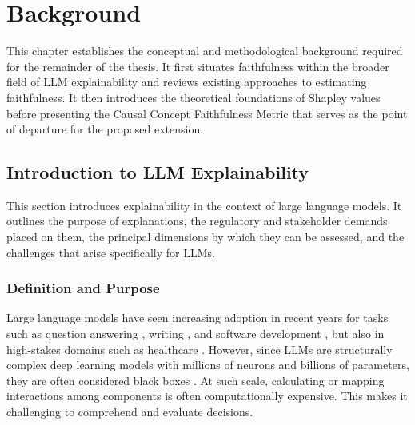 \chapter{Background}
This chapter establishes the conceptual and methodological background required for the remainder of the thesis. It first situates faithfulness within the broader field of LLM explainability and reviews existing approaches to estimating faithfulness. It then introduces the theoretical foundations of Shapley values before presenting the Causal Concept Faithfulness Metric that serves as the point of departure for the proposed extension.

\section{Introduction to LLM Explainability}
This section introduces explainability in the context of large language models. It outlines the purpose of explanations, the regulatory and stakeholder demands placed on them, the principal dimensions by which they can be assessed, and the challenges that arise specifically for LLMs.

\subsection{Definition and Purpose}
Large language models have seen increasing adoption in recent years for tasks such as question answering \cite{allemangIncreasingAccuracyLLM2025}, writing \cite{liangWidespreadAdoptionLarge2025}, and software development \cite{zhangSurveyLargeLanguage2026}, but also in high-stakes domains such as healthcare \cite{maityLargeLanguageModels2025, laiLargeLanguageModels2024, hungWalkingTightropeEvaluating2023}. However, since LLMs are structurally complex deep learning models with millions of neurons and billions of parameters, they are often considered black boxes \cite{qamarUnderstandingBlackboxInterpretable2023}. At such scale, calculating or mapping interactions among components is often computationally expensive. This makes it challenging to comprehend and evaluate decisions.

